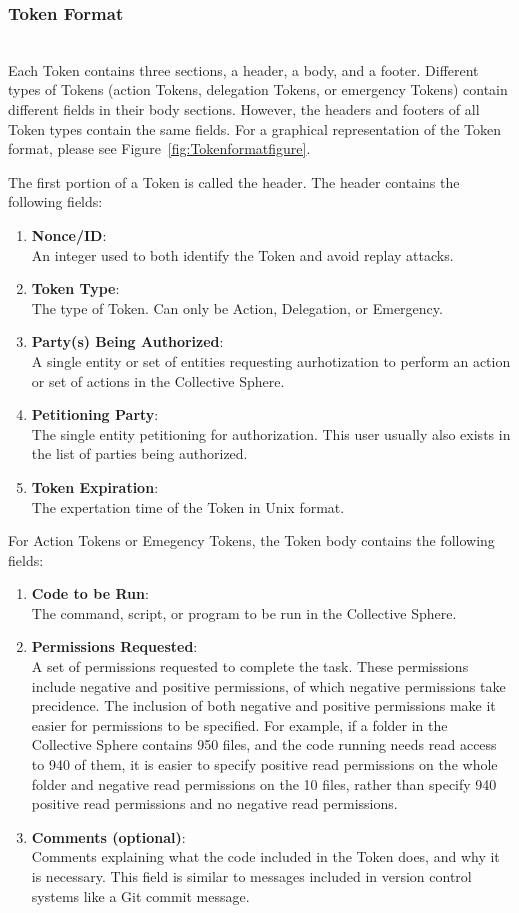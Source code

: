 \subsubsection{Token Format}
\label{sec:Tokenformat}
\mbox{}\\
Each Token contains three sections, a header, a body, and a footer. Different
types of Tokens (action Tokens, delegation Tokens, or emergency Tokens) contain
different fields in their body sections. However, the headers and footers of all
Token types contain the same fields. For a graphical representation of the Token
format, please see Figure~\ref{fig:Tokenformatfigure}.

The first portion of a Token is called the header. The header contains the
following fields:
\begin{enumerate}
\item \textbf{Nonce/ID}:\\ 
An integer used to both identify the Token and avoid replay attacks.
\item \textbf{Token Type}:\\ 
The type of Token. Can only be Action, Delegation, or Emergency.
\item \textbf{Party(s) Being Authorized}:\\
A single entity or set of entities requesting aurhotization to perform an action
or set of actions in the Collective Sphere.
\item \textbf{Petitioning Party}:\\
The single entity petitioning for authorization. This user usually also exists
in the list of parties being authorized.
\item \textbf{Token Expiration}:\\
The expertation time of the Token in Unix format.
\end{enumerate}

For Action Tokens or Emegency Tokens, the Token body contains the following
fields:
\begin{enumerate}
\item \textbf{Code to be Run}:\\
The command, script, or program to be run in the Collective Sphere.
\item \textbf{Permissions Requested}:\\
A set of permissions requested to complete the task. These permissions include
negative and positive permissions, of which negative permissions take
precidence. The inclusion of both negative and positive permissions make it
easier for permissions to be specified. For example, if a folder in the
Collective Sphere contains 950 files, and the code running needs read access to
940 of them, it is easier to specify positive read permissions on the whole
folder and negative read permissions on the 10 files, rather than specify 940
positive read permissions and no negative read permissions.
\item \textbf{Comments (optional)}:\\
Comments explaining what the code included in the Token does, and why it is
necessary. This field is similar to messages included in version control systems
like a Git commit message.
\end{enumerate}

